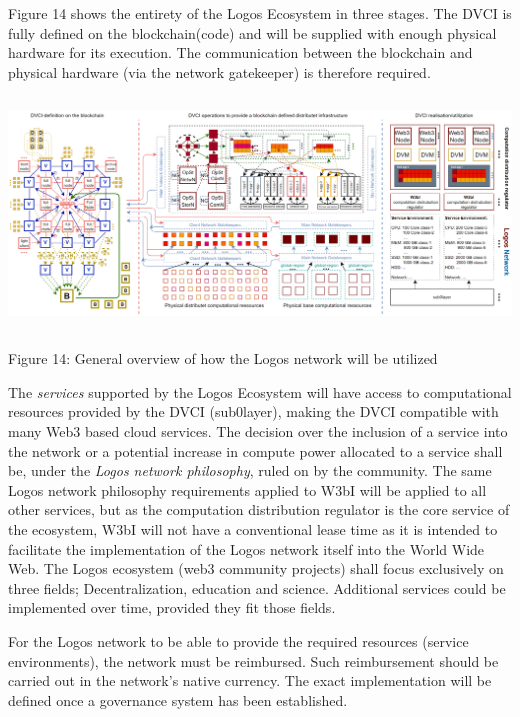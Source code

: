 \documentclass[]{article}
\begin{document}
Figure 14 shows the entirety of the Logos Ecosystem in three stages.
The DVCI is fully defined on the blockchain(code) and will be supplied with enough physical hardware for its execution. 
The communication between the blockchain and physical hardware (via the network gatekeeper) is therefore required.    

\begin{center}
	\includegraphics[height=6.2cm]{network-realisation}
\end{center}
\begin{center}
	Figure 14: General overview of how the Logos network will be utilized
\end{center}

The \textit{services} supported by the Logos Ecosystem will have access to computational resources provided by the DVCI (sub0layer), making the DVCI compatible with many Web3 based cloud services.
The decision over the inclusion of a service into the network or a potential increase in compute power allocated to a service shall be, under the \textit{Logos network philosophy}, ruled on by the community.
The same Logos network philosophy requirements applied to W3bI will be applied to all other services, but as the computation distribution regulator is the core service of the ecosystem, W3bI will not have a conventional lease time as it is intended to facilitate the implementation of the Logos network itself into the World Wide Web.
The Logos ecosystem (web3 community projects) shall focus exclusively on three fields; Decentralization, education and science.
Additional services could be implemented over time, provided they fit those fields.

For the Logos network to be able to provide the required resources (service environments), the network must be reimbursed.
Such reimbursement should be carried out in the network's native currency.
The exact implementation will be defined once a governance system has been established. 
\end{document}
